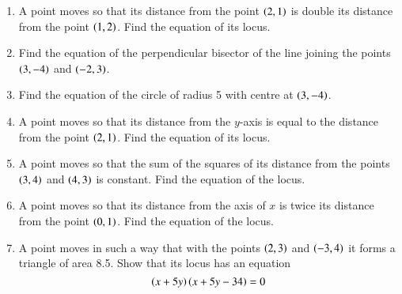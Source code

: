 \begin{enumerate}[1.]
\item A point moves so that its distance from the point $\left(2,1\right)$ is double its distance from the point $\left(1,2\right)$.  Find
the equation of its locus.
\item Find the equation of the perpendicular bisector of the line joining the points $\left(3,-4\right)$ and $\left(-2,3\right)$.
\item Find the equation of the circle of radius 5 with centre at $\left(3,-4\right)$.
\item A point moves so that its distance from the $y$-axis is equal to the distance from the point $\left(2,1\right)$. Find the equation of its locus.
\item  A point moves so that the sum of the squares of its distance from the points $\left(3,4\right)$ and $\left(4,3\right)$ is constant.  Find the equation of the
locus.
\item A point moves so that its distance from the axis of $x$ is twice its distance from the point $\left(0,1\right)$.  Find the equation of the locus.
\item A point moves in such a way that with the points $\left(2,3\right)$ and $\left(-3,4\right)$ it forms a triangle of area 8.5.  Show that its locus has an equation
\begin{equation*}
\left(x+5y\right)\left(x+5y-34\right) = 0
\end{equation*}
\end{enumerate}
